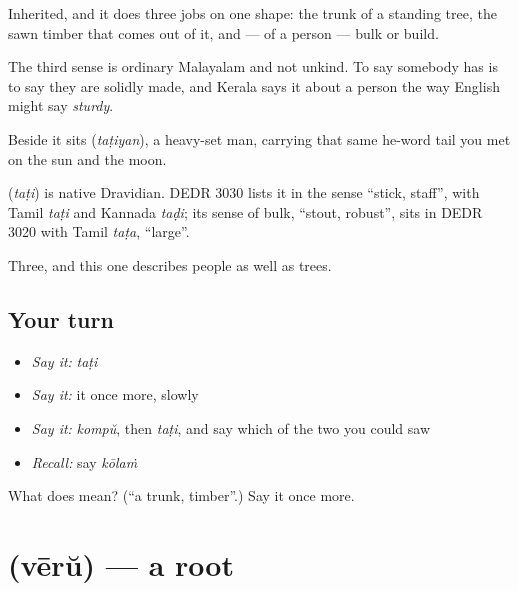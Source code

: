 Inherited, and it does three jobs on one shape: the trunk of a standing tree, the sawn timber that comes out of it, and — of a person — bulk or build.

The third sense is ordinary Malayalam and not unkind. To say somebody has  is to say they are solidly made, and Kerala says it about a person the way English might say \emph{sturdy}.

Beside it sits  (\emph{taṭiyan}), a heavy-set man, carrying that same he-word tail you met on the sun and the moon.

\begin{cousinweb}
\textbf{} (\emph{taṭi}) is native Dravidian. DEDR 3030 lists it in the sense \textquotedblleft{}stick, staff\textquotedblright{}, with Tamil \emph{taṭi} and Kannada \emph{taḍi}; its sense of bulk, \textquotedblleft{}stout, robust\textquotedblright{}, sits in DEDR 3020 with Tamil \emph{taṭa}, \textquotedblleft{}large\textquotedblright{}.
\end{cousinweb}

\begin{grammarlens}[title={What you've built}]
Three, and this one describes people as well as trees.
\end{grammarlens}

\subsection*{Your turn}
\begin{itemize}
\raggedright
  \item \emph{Say it:} \emph{taṭi}
  \item \emph{Say it:} it once more, slowly
  \item \emph{Say it:} \emph{kompŭ}, then \emph{taṭi}, and say which of the two you could saw
  \item \emph{Recall:} say \emph{kōlaṁ}
\end{itemize}

\begin{tcolorbox}[breakable,colback=teal!4,colframe=teal!35!black,title={Before you move on}]
What does  mean? (\textquotedblleft{}a trunk, timber\textquotedblright{}.) Say it once more.
\end{tcolorbox}
\section[\texorpdfstring{\ml{വേര്} (vērŭ)}{വേര് (vērŭ)}]{ (vērŭ) — a root}

